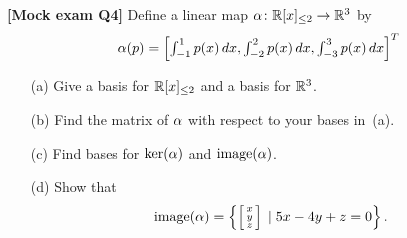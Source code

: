 \documentclass[a4paper]{article}
\begin{document}
\begin{problem}\textbf{[Mock exam Q4]}
 Define a linear map $\alpha\colon{\mathbb{R}}[x]_{\leq 2}\to{\mathbb{R}}^3$ by 
 \[ \alpha(p) = \left[\textstyle
     \int_{-1}^1 p(x)\,dx , 
     \int_{-2}^2 p(x)\,dx , 
     \int_{-3}^3 p(x)\,dx 
    \right]^T
 \]
 \begin{itemize}
  \item[(a)] Give a basis for ${\mathbb{R}}[x]_{\leq 2}$ and a basis
   for ${\mathbb{R}}^3$.
  \item[(b)] Find the matrix of $\alpha$ with respect to your
   bases in~(a).
  \item[(c)] Find bases for $\ker(\alpha)$ and $\operatorname{image}(\alpha)$.
  \item[(d)] Show that
   \[ \operatorname{image}(\alpha) =
       \left\{\left[\begin{smallmatrix} x\\ y\\ z\end{smallmatrix}\right] \;|\; 5x-4y+z=0\right\} .
   \]
 \end{itemize}
\end{problem}
\end{document}
